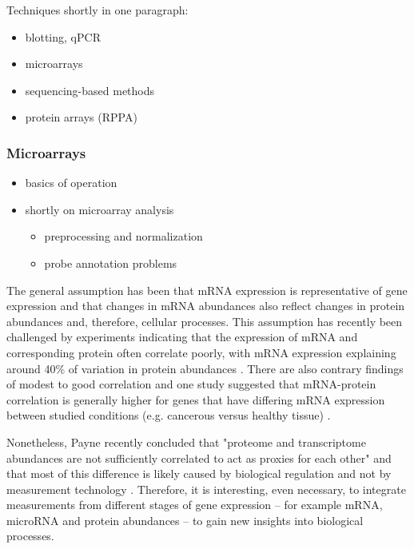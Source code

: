 Techniques shortly in one paragraph:
\begin{itemize}
  \item blotting, qPCR
  \item microarrays
  \item sequencing-based methods
  \item protein arrays (RPPA)
\end{itemize}




\subsubsection{Microarrays}

\begin{itemize}
  \item basics of operation
  \item shortly on microarray analysis
  \begin{itemize}
    \item preprocessing and normalization
    \item probe annotation problems
  \end{itemize}
\end{itemize}


The general assumption has been that mRNA expression is representative of gene
expression and that changes in mRNA abundances also reflect changes in protein
abundances and, therefore, cellular processes. This assumption has recently
been challenged by experiments indicating that the expression of mRNA and
corresponding protein often correlate poorly, with mRNA expression
explaining around 40\% of variation in protein abundances \citep{Vogel2012}.
There are also contrary findings of modest to good correlation
and one study suggested that mRNA-protein correlation is generally higher for
genes that have differing mRNA expression between studied conditions
(e.g. cancerous versus healthy tissue) \citep{Koussounadis2015}.

Nonetheless, Payne recently concluded that "proteome and transcriptome abundances are not
sufficiently correlated to act as proxies for each other" and that
most of this difference is likely caused by biological regulation and not
by measurement technology \cite{Payne2015}.
Therefore, it is interesting, even necessary, to integrate
measurements from different stages of gene expression -- for example
mRNA, microRNA and protein abundances -- to gain new insights
into biological processes.
